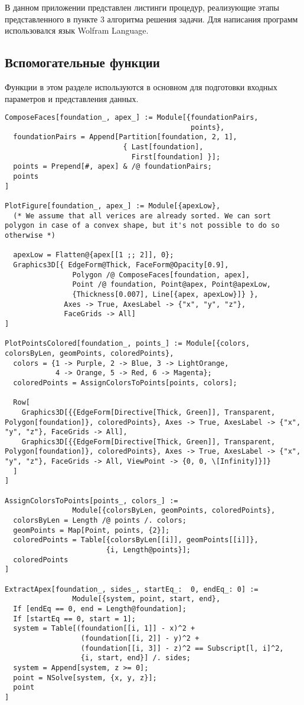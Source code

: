 \documentclass[../main.tex]{subfiles}
\begin{document}
\lstset{style=wolfram_mathematica}

В данном приложении представлен листинги процедур, реализующие этапы представленного в пункте 3 алгоритма решения задачи. Для написания программ использовался язык {\ttfamily Wolfram Language}.

\subsection{Вспомогательные функции}
Функции в этом разделе используются в основном для подготовки входных параметров и представления данных.
\begin{lstlisting}
ComposeFaces[foundation_, apex_] := Module[{foundationPairs,
                                            points},
  foundationPairs = Append[Partition[foundation, 2, 1],
                            { Last[foundation],
                              First[foundation] }];
  points = Prepend[#, apex] & /@ foundationPairs;
  points
]

PlotFigure[foundation_, apex_] := Module[{apexLow},
  (* We assume that all verices are already sorted. We can sort polygon in case of a convex shape, but it's not possible to do so otherwise *)

  apexLow = Flatten@{apex[[1 ;; 2]], 0};
  Graphics3D[{ EdgeForm@Thick, FaceForm@Opacity[0.9],
                Polygon /@ ComposeFaces[foundation, apex],
                Point /@ foundation, Point@apex, Point@apexLow,
                {Thickness[0.007], Line[{apex, apexLow}]} },
              Axes -> True, AxesLabel -> {"x", "y", "z"},
              FaceGrids -> All]
]

PlotPointsColored[foundation_, points_] := Module[{colors, colorsByLen, geomPoints, coloredPoints},
  colors = {1 -> Purple, 2 -> Blue, 3 -> LightOrange,
            4 -> Orange, 5 -> Red, 6 -> Magenta};
  coloredPoints = AssignColorsToPoints[points, colors];

  Row[
    Graphics3D[{{EdgeForm[Directive[Thick, Green]], Transparent, Polygon[foundation]}, coloredPoints}, Axes -> True, AxesLabel -> {"x", "y", "z"}, FaceGrids -> All],
    Graphics3D[{{EdgeForm[Directive[Thick, Green]], Transparent, Polygon[foundation]}, coloredPoints}, Axes -> True, AxesLabel -> {"x", "y", "z"}, FaceGrids -> All, ViewPoint -> {0, 0, \[Infinity]}]}
  ]
]

AssignColorsToPoints[points_, colors_] :=
                Module[{colorsByLen, geomPoints, coloredPoints},
  colorsByLen = Length /@ points /. colors;
  geomPoints = Map[Point, points, {2}];
  coloredPoints = Table[{colorsByLen[[i]], geomPoints[[i]]},
                        {i, Length@points}];
  coloredPoints
]

ExtractApex[foundation_, sides_, startEq_:  0, endEq_: 0] :=
                Module[{system, point, start, end},
  If [endEq == 0, end = Length@foundation];
  If [startEq == 0, start = 1];
  system = Table[(foundation[[i, 1]] - x)^2 +
                  (foundation[[i, 2]] - y)^2 +
                  (foundation[[i, 3]] - z)^2 == Subscript[l, i]^2,
                  {i, start, end}] /. sides;
  system = Append[system, z >= 0];
  point = NSolve[system, {x, y, z}];
  point
]
\end{lstlisting}
\end{document}
